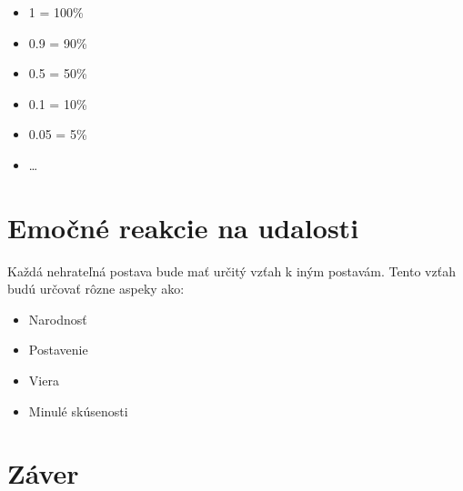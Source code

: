 \documentclass[10pt,twoside,slovak,a4paper]{article}
\begin{document}
\begin{itemize}
	\item 1 = 100\%
	\item 0.9 = 90\%
	\item 0.5 = 50\%
	\item 0.1 = 10\%
	\item 0.05 = 5\%
	\item \dots
\end{itemize}

\pagebreak

\section{Emočné reakcie na udalosti}\label{reakcie}

Každá nehrateľná postava bude mať určitý vzťah k iným postavám. Tento vzťah budú
určovať rôzne aspeky ako:

\begin{itemize}
	\item Narodnosť
	\item Postavenie
	\item Viera
	\item Minulé skúsenosti
\end{itemize}

\pagebreak

\section{Záver}\label{zaver} %


\pagebreak


 
\end{document}
